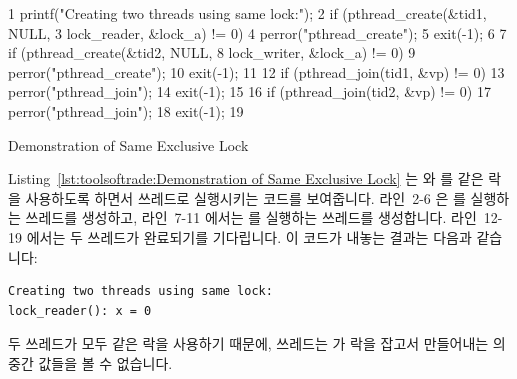\begin{listing}[tbp]
{ \scriptsize
\begin{verbbox}
  1   printf("Creating two threads using same lock:\n");
  2   if (pthread_create(&tid1, NULL,
  3                      lock_reader, &lock_a) != 0) {
  4     perror("pthread_create");
  5     exit(-1);
  6   }
  7   if (pthread_create(&tid2, NULL,
  8                      lock_writer, &lock_a) != 0) {
  9     perror("pthread_create");
 10     exit(-1);
 11   }
 12   if (pthread_join(tid1, &vp) != 0) {
 13     perror("pthread_join");
 14     exit(-1);
 15   }
 16   if (pthread_join(tid2, &vp) != 0) {
 17     perror("pthread_join");
 18     exit(-1);
 19   }
\end{verbbox}
}
\centering
\theverbbox
\caption{Demonstration of Same Exclusive Lock}
\label{lst:toolsoftrade:Demonstration of Same Exclusive Lock}
\end{listing}

Listing~\ref{lst:toolsoftrade:Demonstration of Same Exclusive Lock}
는  와  를 같은  락을 사용하도록
하면서 쓰레드로 실행시키는 코드를 보여줍니다.
라인~2-6 은  를 실행하는 쓰레드를 생성하고, 라인~7-11 에서는
 를 실행하는 쓰레드를 생성합니다.
라인~12-19 에서는 두 쓰레드가 완료되기를 기다립니다.
이 코드가 내놓는 결과는 다음과 같습니다:

\vspace{5pt}
\begin{minipage}[t]{\columnwidth}
\scriptsize
\begin{verbatim}
Creating two threads using same lock:
lock_reader(): x = 0
\end{verbatim}
\end{minipage}
\vspace{5pt}

두 쓰레드가 모두 같은 락을 사용하기 때문에,  쓰레드는
 가 락을 잡고서 만들어내는  의 중간 값들을 볼 수
없습니다.

